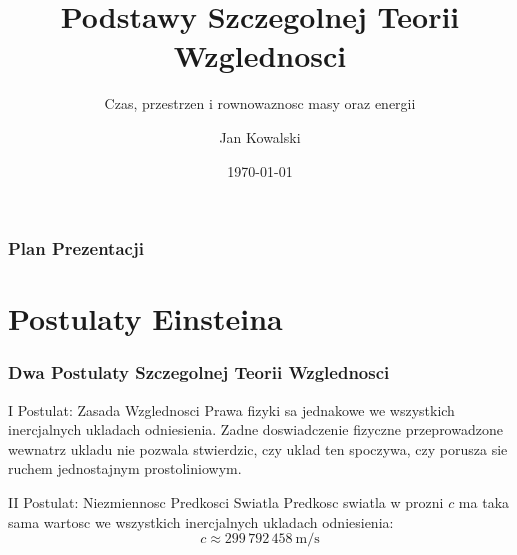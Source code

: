 \documentclass[10pt,aspectratio=169]{beamer}
\title[Szczegolna Teoria Wzglednosci]{Podstawy Szczegolnej Teorii Wzglednosci}
\subtitle{Czas, przestrzen i rownowaznosc masy oraz energii}
\author[Jan Kowalski]{Jan Kowalski}
\institute[Uniwersytet]{Instytut Fizyki Teoretycznej}
\date{\today}
\begin{document}
\begin{frame}
    \titlepage
\end{frame}

\begin{frame}{\frametitle{Plan Prezentacji}}
    \tableofcontents
\end{frame}

\section{Postulaty Einsteina}
\begin{frame}{\frametitle{Dwa Postulaty Szczegolnej Teorii Wzglednosci}}
    \begin{block}{I Postulat: Zasada Wzglednosci}
        Prawa fizyki sa jednakowe we wszystkich inercjalnych ukladach odniesienia. Zadne doswiadczenie fizyczne przeprowadzone wewnatrz ukladu nie pozwala stwierdzic, czy uklad ten spoczywa, czy porusza sie ruchem jednostajnym prostoliniowym.
    \end{block}

    \vspace{0.3cm}
    
    \begin{alertblock}{II Postulat: Niezmiennosc Predkosci Swiatla}
        Predkosc swiatla w prozni $c$ ma taka sama wartosc we wszystkich inercjalnych ukladach odniesienia:
        \[
            c \approx 299\,792\,458\ \text{m/s}
        \]
    \end{alertblock}
\end{frame}

\end{document}
